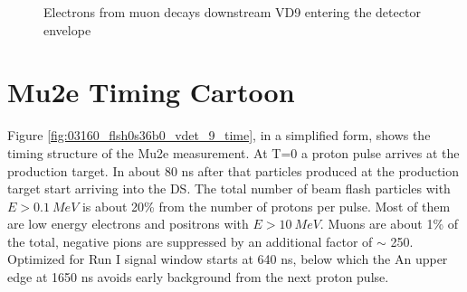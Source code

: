 \documentclass[12pt]{article}
\begin{document}
\begin{figure}[H]
  \hspace{-0.5in}
  \caption{
    \label{fig_bmum0sb8b0_crt_vs_mom}
    Electrons from muon decays downstream VD9 entering the detector envelope
  }
\end{figure}

\newpage
\section {Mu2e Timing Cartoon}

Figure \ref{fig:03160_flsh0s36b0_vdet_9_time}, in a simplified form, shows the
timing structure of the Mu2e measurement. 
At T=0 a proton pulse arrives at the production target.
In about 80 ns after that particles produced at the production target start arriving
into the DS. The total number of beam flash particles with $E > 0.1 ~MeV$ is about 20\%
from the number of protons per pulse. Most of them are low energy electrons and positrons
with $E > 10 ~MeV$. 
%
Muons are about 1\% of the total, negative pions are suppressed by an additional factor of $\sim$ 250.
%
\noindent
Optimized for Run I signal window starts at 640 ns, below which the 
An upper edge at 1650 ns avoids early background from the next proton pulse.
\end{document}
